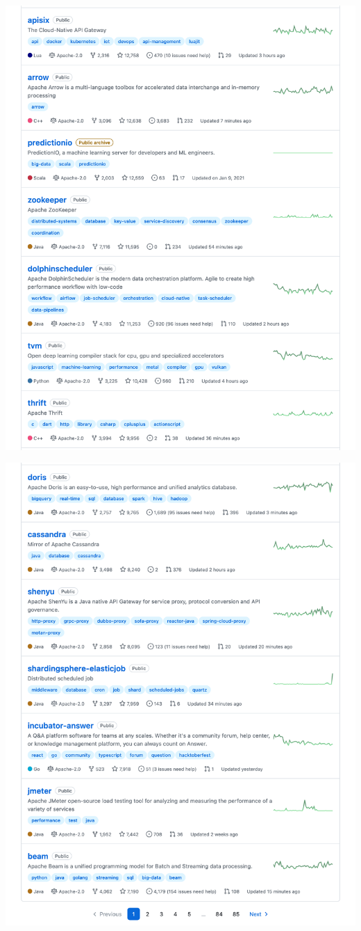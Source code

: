 \Continuing
\begin{center}
    \includegraphics[width=40em]{beam-github-stars-dropdown-p4}
\end{center}
\WillContinue
\pagebreak

\Continuing
\begin{center}
    \includegraphics[width=40em]{beam-github-stars-dropdown-p5}
\end{center}

\pagebreak

